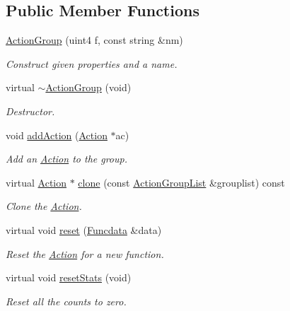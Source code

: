 \subsection*{Public Member Functions}
\begin{DoxyCompactItemize}
\item 
\mbox{\hyperlink{class_action_group_a36259f8d2aef3e00f7fb8688331653f6}{Action\+Group}} (uint4 f, const string \&nm)
\begin{DoxyCompactList}\small\item\em Construct given properties and a name. \end{DoxyCompactList}\item 
virtual \mbox{\hyperlink{class_action_group_aa7225f652d1984bc106a3b208366de82}{$\sim$\+Action\+Group}} (void)
\begin{DoxyCompactList}\small\item\em Destructor. \end{DoxyCompactList}\item 
void \mbox{\hyperlink{class_action_group_a868ae1f92d3369b22075d337b8681ffe}{add\+Action}} (\mbox{\hyperlink{class_action}{Action}} $\ast$ac)
\begin{DoxyCompactList}\small\item\em Add an \mbox{\hyperlink{class_action}{Action}} to the group. \end{DoxyCompactList}\item 
virtual \mbox{\hyperlink{class_action}{Action}} $\ast$ \mbox{\hyperlink{class_action_group_ace0724b13474c6c098eb25aee96dd1d6}{clone}} (const \mbox{\hyperlink{class_action_group_list}{Action\+Group\+List}} \&grouplist) const
\begin{DoxyCompactList}\small\item\em Clone the \mbox{\hyperlink{class_action}{Action}}. \end{DoxyCompactList}\item 
virtual void \mbox{\hyperlink{class_action_group_ae5f0c78e136f9bb5b9bcd6256b8ad097}{reset}} (\mbox{\hyperlink{class_funcdata}{Funcdata}} \&data)
\begin{DoxyCompactList}\small\item\em Reset the \mbox{\hyperlink{class_action}{Action}} for a new function. \end{DoxyCompactList}\item 
virtual void \mbox{\hyperlink{class_action_group_a536ed9307295585894a5f083415f2f77}{reset\+Stats}} (void)
\begin{DoxyCompactList}\small\item\em Reset all the counts to zero. \end{DoxyCompactList}\item 

\end{DoxyCompactItemize}
